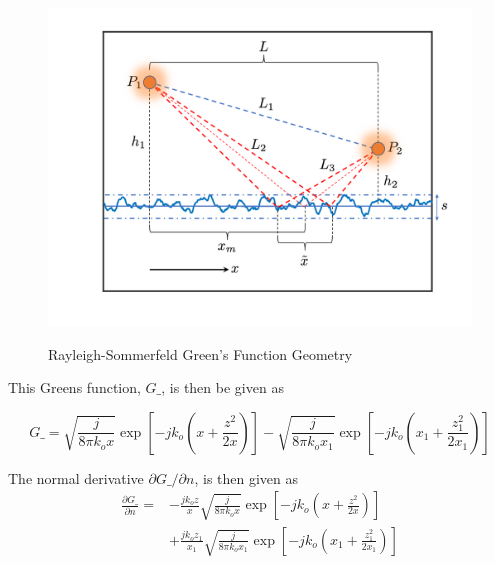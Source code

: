 \begin{figure}[H]
  \begin{center}
\includegraphics[width=5in]{../media/analysis/multipath_layout.png}
  \end{center}
  \renewcommand{\baselinestretch}{1} \small\normalsize
  \begin{quote}
    \caption[Rayleigh-Sommerfeld Green's Function Geometry]{Rayleigh-Sommerfeld Green's Function Geometry\label{mp_fig:2a}}
  \end{quote}
\end{figure}
\renewcommand{\baselinestretch}{2} \small\normalsize

This Greens function, $G\_$, is then be given as

\begin{equation}
G\_= \sqrt{\frac{j}{8\pi k_ox}}\exp\left[-jk_o\left(x + \frac{z^2}{2x}\right) \right] - \sqrt{\frac{j}{8\pi k_ox_1}}\exp\left[-jk_o\left(x_1 + \frac{z_1^2}{2x_1}\right) \right]
\label{mp_eq:11aab}
\end{equation}
\renewcommand{\baselinestretch}{2} \small\normalsize

The normal derivative $\partial G\_/\partial n$, is then given as
\begin{equation}
\begin{aligned}
\frac{\partial G\_}{\partial n}= &-\frac{jk_oz}{x}\sqrt{\frac{j}{8\pi k_ox}}\exp\left[-jk_o\left(x + \frac{z^2}{2x}\right) \right] \\
&+\frac{jk_oz_1}{x_1}\sqrt{\frac{j}{8\pi k_ox_1}}\exp\left[-jk_o\left(x_1 + \frac{z_1^2}{2x_1}\right) \right]
\end{aligned}
\label{mp_eq:11aac}
\end{equation}
\renewcommand{\baselinestretch}{2} \small\normalsize

